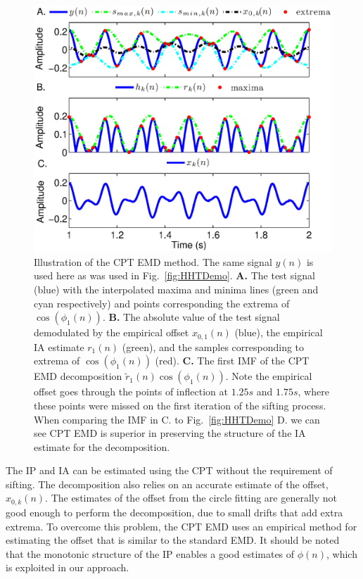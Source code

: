 \documentclass[11pt,draftcls,onecolumn]{IEEEtran}
\begin{document}
\begin{figure}
\centering
\includegraphics[scale=0.42]{./Figures/CPT_EMD_demo.eps}
\caption[CPT_EMD]{Illustration of the CPT EMD method. The same signal $y(n)$ is used here as was used in Fig.~\ref{fig:HHTDemo}. \textbf{A.} The test signal (blue) with the interpolated maxima and minima lines (green and cyan respectively) and points corresponding the extrema of $\cos\left(\phi_1(n)\right)$. \textbf{B.} The absolute value of the test signal demodulated by the empirical offset $x_{0,1}(n)$ (blue), the empirical IA estimate $r_{1}(n)$ (green), and the samples corresponding to extrema of $\cos\left(\phi_1\left(n\right)\right)$ (red). \textbf{C.} The first IMF of the CPT EMD decomposition $\tilde{r}_1(n)\cos\left(\phi_1\left(n\right)\right)$. Note the empirical offset goes through the points of inflection at $1.25 s$ and $1.75s$, where these points were missed on the first iteration of the sifting process. When comparing the IMF in C. to Fig.~\ref{fig:HHTDemo} D. we can see CPT EMD is superior in preserving the structure of the IA estimate for the decomposition.}
\label{CPT_EMD}
\end{figure}

The IP and IA can be estimated using the CPT without the requirement of sifting. The decomposition also relies on an accurate estimate of the offset, $x_{0,k}(n)$. The estimates of the offset from the circle fitting are generally not good enough to perform the decomposition, due to small drifts that add extra extrema. To overcome this problem, the CPT EMD uses an empirical method for estimating the offset that is similar to the standard EMD. It should be noted that the monotonic structure of the IP enables a good estimates of $\phi(n)$, which is exploited in our approach. 
\end{document}
